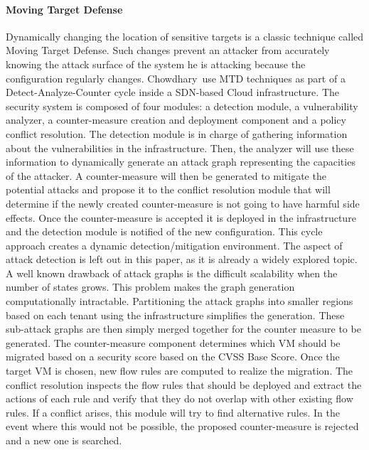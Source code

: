 \paragraph{Moving Target Defense} Dynamically changing the location of sensitive targets is a classic technique called Moving Target Defense. Such changes prevent an attacker from accurately knowing the attack surface of the system he is attacking because the configuration regularly changes. Chowdhary~\etal use MTD techniques as part of a Detect-Analyze-Counter cycle inside a SDN-based Cloud infrastructure. 
The security system is composed of four modules: a detection module, a vulnerability analyzer, a counter-measure creation and deployment component and a policy conflict resolution.
The detection module is in charge of gathering information about the vulnerabilities in the infrastructure.
Then, the analyzer will use these information to dynamically generate an attack graph representing the capacities of the attacker. 
A counter-measure will then be generated to mitigate the potential attacks and propose it to the conflict resolution module that will determine if the newly created counter-measure is not going to have harmful side effects. Once the counter-measure is accepted it is deployed in the infrastructure and the detection module is notified of the new configuration. This cycle approach creates a dynamic detection/mitigation environment.
The aspect of attack detection is left out in this paper, as it is already a widely explored topic.
A well known drawback of attack graphs is the difficult scalability when the number of states grows.
This problem makes the graph generation computationally intractable. Partitioning the attack graphs into smaller regions based on each tenant using the infrastructure simplifies the generation.
These sub-attack graphs are then simply merged together for the counter measure to be generated.
The counter-measure component determines which VM should be migrated based on a security score based on the CVSS Base Score.
Once the target VM is chosen, new flow rules are computed to realize the migration. 
The conflict resolution inspects the flow rules that should be deployed and extract the actions of each rule and verify that they do not overlap with other existing flow rules. If a conflict arises, this module will try to find alternative rules. In the event where this would not be possible, the proposed counter-measure is rejected and a new one is searched.

